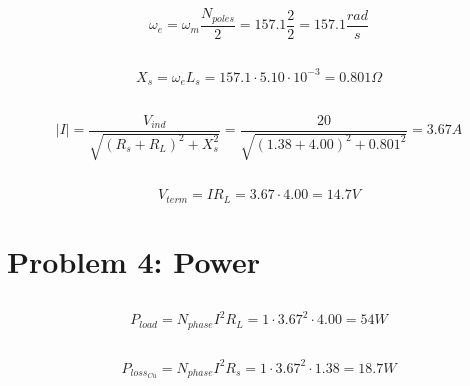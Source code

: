 \documentclass[11pt,a4paper]{article}
\begin{document}
\subsection{}
\begin{equation}
    \omega_e = \omega_m\frac{N_{poles}}{2} = 157.1\frac{2}{2} = 157.1\frac{rad}{s}
\end{equation}

\subsection{}
\begin{equation}
    X_s = \omega_e L_s = 157.1\cdot5.10\cdot10^{-3} = 0.801\Omega
\end{equation}

\subsection{}
\begin{equation}
    |I| = \frac{V_{ind}}{\sqrt{(R_s + R_L)^2 + X_s^2}}
    = \frac{20}{\sqrt{(1.38+4.00)^2 + 0.801^2}}
    = 3.67\unit{A}
\end{equation}

\subsection{}
\begin{equation}
    V_{term} = IR_L = 3.67\cdot4.00 = 14.7\unit{V}
\end{equation}

\vspace{0.5cm}

\section{Problem 4: Power}
\subsection{}
\begin{equation}
    P_{load} = N_{phase}I^2R_L = 1\cdot3.67^2\cdot4.00 = 54\unit{W}
\end{equation}

\subsection{}
\begin{equation}
    P_{loss_{Cu}} = N_{phase}I^2R_s = 1\cdot3.67^2\cdot1.38 = 18.7\unit{W}
\end{equation}
\end{document}
